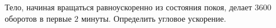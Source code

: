 Тело, начиная вращаться равноускоренно из состояния покоя, делает $3600$
оборотов в первые $2$ минуты. Определить угловое ускорение.
